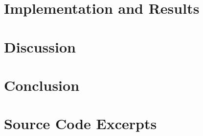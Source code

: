 \documentclass[14pt, a4paper, oneside]{extreport}
\numberwithin{equation}{chapter}
\numberwithin{figure}{chapter}
\numberwithin{table}{chapter}
\begin{document}
\chapter{Implementation and Results}


\chapter{Discussion}


\chapter*{Conclusion}





\appendix
\chapter{Source Code Excerpts}
% 
\end{document}
